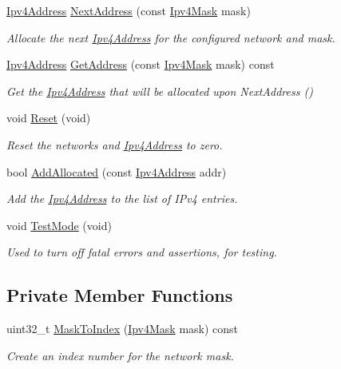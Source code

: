 \begin{DoxyCompactItemize}
\hyperlink{classns3_1_1Ipv4Address}{Ipv4\+Address} \hyperlink{classns3_1_1Ipv4AddressGeneratorImpl_afd9029e16d648beea57a7b0b960e0264}{Next\+Address} (const \hyperlink{classns3_1_1Ipv4Mask}{Ipv4\+Mask} mask)
\begin{DoxyCompactList}\small\item\em Allocate the next \hyperlink{classns3_1_1Ipv4Address}{Ipv4\+Address} for the configured network and mask. \end{DoxyCompactList}\item 
\hyperlink{classns3_1_1Ipv4Address}{Ipv4\+Address} \hyperlink{classns3_1_1Ipv4AddressGeneratorImpl_a28522cc11a2ef89ff14f8ffa2b950548}{Get\+Address} (const \hyperlink{classns3_1_1Ipv4Mask}{Ipv4\+Mask} mask) const 
\begin{DoxyCompactList}\small\item\em Get the \hyperlink{classns3_1_1Ipv4Address}{Ipv4\+Address} that will be allocated upon Next\+Address () \end{DoxyCompactList}\item 
void \hyperlink{classns3_1_1Ipv4AddressGeneratorImpl_a9c052edcb5b32990e7b33e5fc064af7d}{Reset} (void)
\begin{DoxyCompactList}\small\item\em Reset the networks and \hyperlink{classns3_1_1Ipv4Address}{Ipv4\+Address} to zero. \end{DoxyCompactList}\item 
bool \hyperlink{classns3_1_1Ipv4AddressGeneratorImpl_a62767f63770e87118f36e702de8bd26c}{Add\+Allocated} (const \hyperlink{classns3_1_1Ipv4Address}{Ipv4\+Address} addr)
\begin{DoxyCompactList}\small\item\em Add the \hyperlink{classns3_1_1Ipv4Address}{Ipv4\+Address} to the list of I\+Pv4 entries. \end{DoxyCompactList}\item 
void \hyperlink{classns3_1_1Ipv4AddressGeneratorImpl_a0c2908ba8c232734e5aef5f8d84f9e78}{Test\+Mode} (void)
\begin{DoxyCompactList}\small\item\em Used to turn off fatal errors and assertions, for testing. \end{DoxyCompactList}\end{DoxyCompactItemize}
\subsection*{Private Member Functions}
\begin{DoxyCompactItemize}
\item 
uint32\+\_\+t \hyperlink{classns3_1_1Ipv4AddressGeneratorImpl_a5049d4c03ccdeb1fcce7ab50baf23a86}{Mask\+To\+Index} (\hyperlink{classns3_1_1Ipv4Mask}{Ipv4\+Mask} mask) const 
\begin{DoxyCompactList}\small\item\em Create an index number for the network mask. \end{DoxyCompactList}\end{DoxyCompactItemize}
